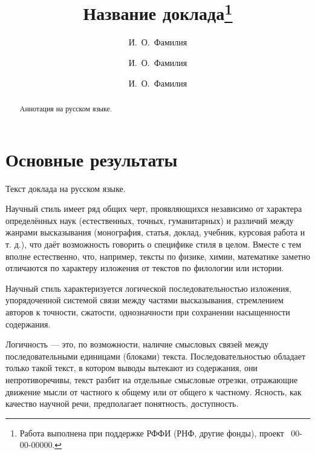 \documentclass[12pt]{llncs}
\begin{document}

\title{Название доклада\thanks{Работа выполнена при поддержке РФФИ (РНФ, другие фонды), проект \textnumero~00-00-00000.}}
\author{И.~О.~Фамилия
  \and
  И.~О.~Фамилия
  \and
  И.~О.~Фамилия
} %

\maketitle

\begin{abstract}
Аннотация на русском языке.

\end{abstract}

\section{Основные результаты} %

Текст доклада на русском языке.

Научный стиль имеет ряд общих черт, проявляющихся независимо от характера определённых наук (естественных, точных, гуманитарных) и различий между жанрами высказывания (монография, статья, доклад, учебник, курсовая работа и т. д.), что даёт возможность говорить о специфике стиля в целом. Вместе с тем вполне естественно, что, например, тексты по физике, химии, математике заметно отличаются по характеру изложения от текстов по филологии или истории.

Научный стиль характеризуется логической последовательностью изложения, упорядоченной системой связи между частями высказывания, стремлением авторов к точности, сжатости, однозначности при сохранении насыщенности содержания.

    Логичность — это, по возможности, наличие смысловых связей между последовательными единицами (блоками) текста.
    Последовательностью обладает только такой текст, в котором выводы вытекают из содержания, они непротиворечивы, текст разбит на отдельные смысловые отрезки, отражающие движение мысли от частного к общему или от общего к частному.
    Ясность, как качество научной речи, предполагает понятность, доступность.
\end{document}
